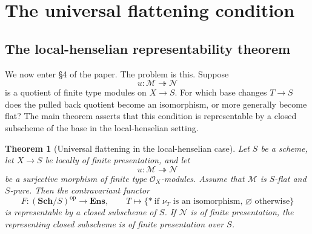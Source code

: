 \documentclass[11pt,oneside]{article}
\newtheorem{theorem}{Theorem}[section]
\newcommand{\M}{\mathcal M}
\newcommand{\N}{\mathcal N}
\newcommand{\OO}{\mathcal O}
\newcommand{\op}{\mathrm{op}}
\newcommand{\Sch}{\mathbf{Sch}}
\newcommand{\Ens}{\mathbf{Ens}}
\begin{document}
\section{The universal flattening condition}

\subsection{The local-henselian representability theorem}

We now enter \S4 of the paper.  The problem is this.  Suppose
\[
u\colon \M\twoheadrightarrow \N
\]
is a quotient of finite type modules on $X\to S$.  For which base changes $T\to S$ does the pulled back quotient become an isomorphism, or more generally become flat?  The main theorem asserts that this condition is representable by a closed subscheme of the base in the local-henselian setting.

\begin{theorem}[Universal flattening in the local-henselian case]\label{thm:universal-flattening-local}
Let $S$ be a scheme, let $X\to S$ be locally of finite presentation, and let
\[
u\colon \M\twoheadrightarrow \N
\]
be a surjective morphism of finite type $\OO_X$-modules.  Assume that $\M$ is $S$-flat and $S$-pure.  Then the contravariant functor
\[
F\colon (\Sch/S)^\op\to \Ens,
\qquad
T\longmapsto \{\ast\ \text{if } \nu_T\text{ is an isomorphism, }\varnothing\text{ otherwise}\}
\]
is representable by a closed subscheme of $S$.  If $\N$ is of finite presentation, the representing closed subscheme is of finite presentation over $S$.
\end{theorem}
\end{document}

